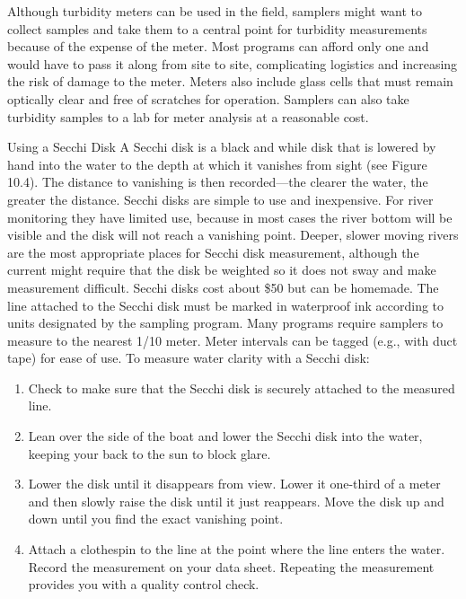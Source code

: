 \documentclass{article}
\begin{document}
Although turbidity meters can be used in the field, samplers might want
to collect samples and take them to a central point for turbidity
measurements because of the expense of the meter. Most programs can
afford only one and would have to pass it along from site to site,
complicating logistics and increasing the risk of damage to the meter.
Meters also include glass cells that must remain optically clear and
free of scratches for operation. Samplers can also take turbidity
samples to a lab for meter analysis at a reasonable cost.

Using a Secchi Disk A Secchi disk is a black and while disk that is
lowered by hand into the water to the depth at which it vanishes from
sight (see Figure 10.4). The distance to vanishing is then
recorded---the clearer the water, the greater the distance. Secchi disks
are simple to use and inexpensive. For river monitoring they have
limited use, because in most cases the river bottom will be visible and
the disk will not reach a vanishing point. Deeper, slower moving rivers
are the most appropriate places for Secchi disk measurement, although
the current might require that the disk be weighted so it does not sway
and make measurement difficult. Secchi disks cost about \$50 but can be
homemade. The line attached to the Secchi disk must be marked in
waterproof ink according to units designated by the sampling program.
Many programs require samplers to measure to the nearest 1/10 meter.
Meter intervals can be tagged (e.g., with duct tape) for ease of use. To
measure water clarity with a Secchi disk:

\begin{enumerate}
\def\labelenumi{\arabic{enumi}.}
\tightlist
\item
  Check to make sure that the Secchi disk is securely attached to the
  measured line.
\item
  Lean over the side of the boat and lower the Secchi disk into the
  water, keeping your back to the sun to block glare.
\item
  Lower the disk until it disappears from view. Lower it one-third of a
  meter and then slowly raise the disk until it just reappears. Move the
  disk up and down until you find the exact vanishing point.
\item
  Attach a clothespin to the line at the point where the line enters the
  water. Record the measurement on your data sheet. Repeating the
  measurement provides you with a quality control check.
\end{enumerate}
\end{document}
